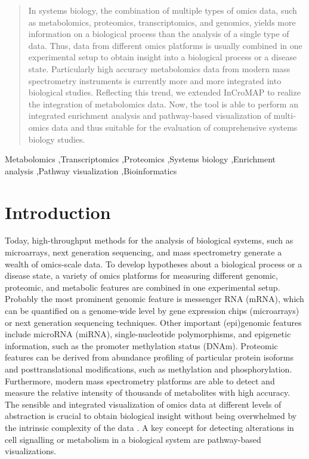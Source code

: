 \documentclass[final,5p,times,twocolumn]{elsarticle}
\begin{document}
\begin{frontmatter}
\begin{abstract}
In systems biology, the combination of multiple types of omics data, such as metabolomics, proteomics, transcriptomics, and genomics, yields more information on a biological process than the analysis of a single type of data. Thus, data from different omics platforms is usually combined in one experimental setup to obtain insight into a biological process or a disease state. Particularly high accuracy metabolomics data from modern mass spectrometry instruments is currently more and more integrated into biological studies. Reflecting this trend, we extended InCroMAP to realize the integration of metabolomics data. Now, the tool is able to perform an integrated enrichment analysis and pathway-based visualization of multi-omics data and thus suitable for the evaluation of comprehensive systems biology studies.
\end{abstract}

\begin{keyword}
Metabolomics \sep Transcriptomics \sep Proteomics \sep Systems biology \sep Enrichment analysis \sep Pathway visualization \sep Bioinformatics

\end{keyword}

\end{frontmatter}


\section{Introduction}
Today, high-throughput methods for the analysis of biological systems, such as microarrays, next generation sequencing, and mass spectrometry generate a wealth of omics-scale data. To develop hypotheses about a biological process or a disease state, a variety of omics platforms for measuring different genomic, proteomic, and metabolic features are combined in one experimental setup. Probably the most prominent genomic feature is messenger RNA (mRNA), which can be quantified on a genome-wide level by gene expression chips (microarrays) or next generation sequencing techniques. Other important (epi)genomic features include microRNA (miRNA), single-nucleotide polymorphisms, and epigenetic information, such as the promoter methylation status (DNAm). Proteomic features can be derived from abundance profiling of particular protein isoforms and posttranslational modifications, such as methylation and phosphorylation. Furthermore, modern mass spectrometry platforms are able to detect and measure the relative intensity of thousands of metabolites with high accuracy. The sensible and integrated visualization of omics data at different levels of abstraction is crucial to obtain biological insight without being overwhelmed by the intrinsic complexity of the data \cite{Gehlenborg2010}. A key concept for detecting alterations in cell signalling or metabolism in a biological system are pathway-based visualizations.
\end{document}
